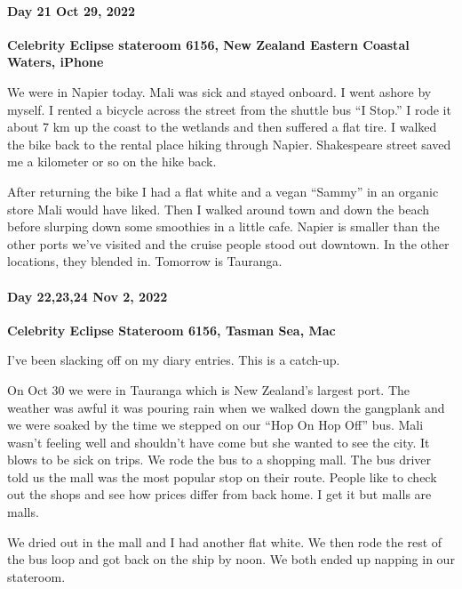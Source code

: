 \hypertarget{day-21-oct-29-2022}{%
\paragraph{\texorpdfstring{\textbf{Day 21 Oct 29, 2022}}{Day 21 Oct 29, 2022}}\label{day-21-oct-29-2022}}

\textbf{Celebrity Eclipse stateroom 6156, New Zealand Eastern Coastal Waters, iPhone}

We were in Napier today. Mali was sick and stayed onboard. I went ashore
by myself. I rented a bicycle across the street from the shuttle bus ``I
Stop.'' I rode it about 7 km up the coast to the wetlands and then
suffered a flat tire. I walked the bike back to the rental place hiking
through Napier. Shakespeare street saved me a kilometer or so on the
hike back.

After returning the bike I had a flat white and a vegan ``Sammy'' in an
organic store Mali would have liked. Then I walked around town and down
the beach before slurping down some smoothies in a little cafe. Napier
is smaller than the other ports we've visited and the cruise people
stood out downtown. In the other locations, they blended in. Tomorrow is
Tauranga.

\hypertarget{day-222324-nov-2-2022}{%
\paragraph{\texorpdfstring{\textbf{Day 22,23,24 Nov 2, 2022}}{Day 22,23,24 Nov 2, 2022}}\label{day-222324-nov-2-2022}}

\textbf{Celebrity Eclipse Stateroom 6156, Tasman Sea, Mac}

I've been slacking off on my diary entries. This is a catch-up.

On Oct 30 we were in Tauranga which is New Zealand's largest port. The
weather was awful it was pouring rain when we walked down the gangplank
and we were soaked by the time we stepped on our ``Hop On Hop Off'' bus.
Mali wasn't feeling well and shouldn't have come but she wanted to see
the city. It blows to be sick on trips. We rode the bus to a shopping
mall. The bus driver told us the mall was the most popular stop on their
route. People like to check out the shops and see how prices differ from
back home. I get it but malls are malls.

We dried out in the mall and I had another flat white. We then rode the
rest of the bus loop and got back on the ship by noon. We both ended up
napping in our stateroom.

